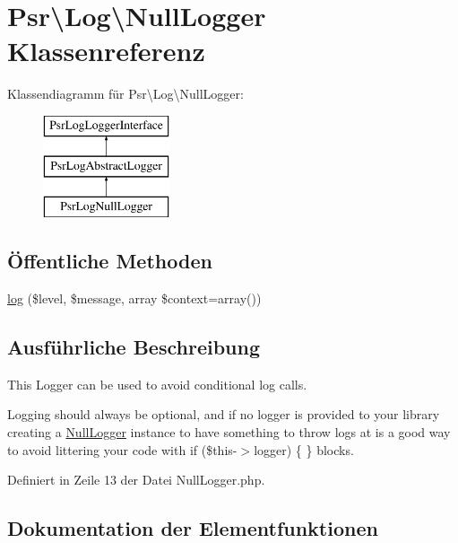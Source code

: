 \hypertarget{class_psr_1_1_log_1_1_null_logger}{}\section{Psr\textbackslash{}Log\textbackslash{}Null\+Logger Klassenreferenz}
\label{class_psr_1_1_log_1_1_null_logger}
Klassendiagramm für Psr\textbackslash{}Log\textbackslash{}Null\+Logger\+:\begin{figure}[H]
\begin{center}
\leavevmode
\includegraphics[height=3.000000cm]{class_psr_1_1_log_1_1_null_logger}
\end{center}
\end{figure}
\subsection*{Öffentliche Methoden}
\begin{DoxyCompactItemize}
\item 
\mbox{\hyperlink{class_psr_1_1_log_1_1_null_logger_acb83ac6b83932e7b4de85fa60728d5ef}{log}} (\$level, \$message, array \$context=array())
\end{DoxyCompactItemize}


\subsection{Ausführliche Beschreibung}
This Logger can be used to avoid conditional log calls.

Logging should always be optional, and if no logger is provided to your library creating a \mbox{\hyperlink{class_psr_1_1_log_1_1_null_logger}{Null\+Logger}} instance to have something to throw logs at is a good way to avoid littering your code with {\ttfamily if (\$this-\/$>$logger) \{ \}} blocks. 

Definiert in Zeile 13 der Datei Null\+Logger.\+php.



\subsection{Dokumentation der Elementfunktionen}
\mbox{\label{class_psr_1_1_log_1_1_null_logger_acb83ac6b83932e7b4de85fa60728d5ef}} 
